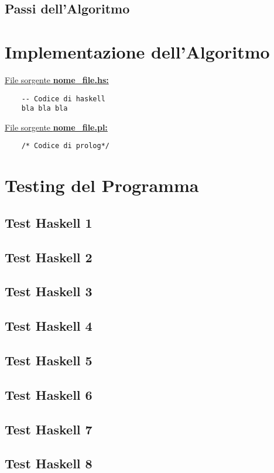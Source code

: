 \documentclass{article}
\begin{document}
\subsection{Passi dell'Algoritmo}
\newpage

\section{Implementazione dell'Algoritmo}
\raggedright
\underline{File sorgente \textbf{nome\_file.hs:}}
\lstset{language=Haskell}
\begin{lstlisting}
	-- Codice di haskell
	bla bla bla
\end{lstlisting}
\newpage
\raggedright
\underline{File sorgente \textbf{nome\_file.pl:}}
\lstset{language=Prolog}
\begin{lstlisting}
	/* Codice di prolog*/
\end{lstlisting}
\newpage

\section{Testing del Programma}
\subsection*{Test Haskell 1}
\subsection*{Test Haskell 2}
\subsection*{Test Haskell 3}
\subsection*{Test Haskell 4}
\subsection*{Test Haskell 5}
\subsection*{Test Haskell 6}
\subsection*{Test Haskell 7}
\subsection*{Test Haskell 8}
\end{document}
